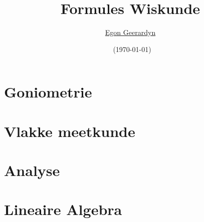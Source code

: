 \documentclass[pdftex,fleqn,a4paper]{article}
\author{\href{mailto:Egon.Geerardyn@vub.ac.be}{Egon Geerardyn}}
\title{Formules Wiskunde}
\date{\revisie\ (\today)}
\newcommand{\revisie}{revisie 3.6}
\begin{document}
  \addtolength{\textwidth}{3cm}
  \maketitlepage
  \newpage 
  \setlength{\voffset}{-2cm}

  
   \newpage
   \tableofcontents
   \newpage
  
 \twocolumn
 \section{Goniometrie}
 \label{sec:Goniometrie}
   
    
    \onecolumn
    
    
    
    
    
 \newpage
 \section{Vlakke meetkunde}
 \label{sec:VlakkeMeetkunde}
    
    
    
    
      
 
   \newpage
 \section{Analyse}
 \label{sec:Analyse}
   
   
   
   
   
   
   
   
 
 \section{Lineaire Algebra}
 \label{sec:LineaireAlgebra}  
   
      
\end{document}
